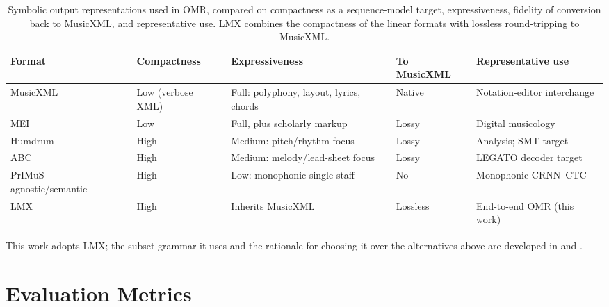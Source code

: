 \begin{table}[htbp]
\centering
\small
\setlength{\tabcolsep}{5pt}
\renewcommand{\arraystretch}{1.35}
\begin{tabularx}{\textwidth}{@{} l L L l L @{}}
\toprule
\textbf{Format} & \textbf{Compactness} & \textbf{Expressiveness} & \textbf{To MusicXML} & \textbf{Representative use} \\
\midrule
MusicXML~\cite{goodMusicXML2001}            & Low (verbose XML)        & Full: polyphony, layout, lyrics, chords & Native    & Notation-editor interchange \\ \tfgrowsep
MEI~\cite{rolandMEI2002}                    & Low                      & Full, plus scholarly markup             & Lossy     & Digital musicology \\ \tfgrowsep
Humdrum ~\cite{huronHumdrum2002} & High                   & Medium: pitch/rhythm focus              & Lossy     & Analysis; SMT target \\ \tfgrowsep
ABC~\cite{walshawABC2011}                   & High                     & Medium: melody/lead-sheet focus         & Lossy     & LEGATO decoder target \\ \tfgrowsep
PrIMuS agnostic/semantic~\cite{calvoZaragozaEndToEndNeural2018} & High & Low: monophonic single-staff         & No        & Monophonic CRNN--CTC \\ \tfgrowsep
LMX~\cite{mayerPracticalEndToEnd2024}       & High                     & Inherits MusicXML                       & Lossless  & End-to-end OMR (this work) \\
\bottomrule
\end{tabularx}
\caption{Symbolic output representations used in OMR, compared on
compactness as a sequence-model target, expressiveness, fidelity of
conversion back to MusicXML, and representative use. LMX combines the
compactness of the linear formats with lossless round-tripping to
MusicXML.}
\label{tab:omr-formats}
\end{table}

This work adopts LMX; the subset grammar it uses and the rationale for
choosing it over the alternatives above are developed in
 and .

\section{Evaluation Metrics}
\label{sec:soa-metrics}

